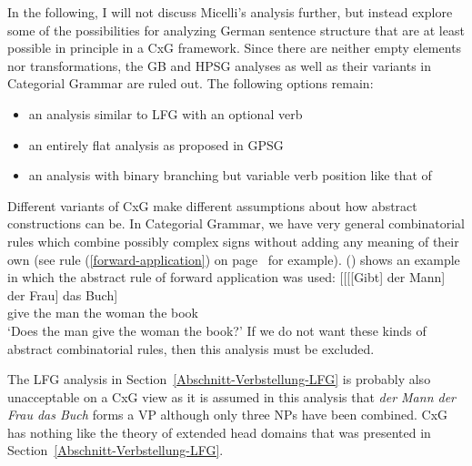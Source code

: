 In the following, I will not discuss Micelli's analysis further, but instead explore some of the possibilities for analyzing German sentence
structure that are at least possible in principle in a CxG framework. Since there are neither empty elements nor transformations, the GB and HPSG analyses
as well as their variants in Categorial Grammar are ruled out.
The following options remain:
\begin{itemize}
\item an analysis similar to LFG with an optional verb
\item  an entirely flat analysis as proposed in GPSG
\item an analysis with binary branching but variable verb position like that of \citet[]{Steedman2000a-u}
\end{itemize}
%
Different variants of CxG make different assumptions about how abstract constructions can be.
In Categorial Grammar, we have very general combinatorial rules which combine possibly complex signs without adding any meaning
of their own (see rule (\ref{forward-application}) on page~\pageref{forward-application} for
example). () shows an example in which the abstract rule of forward application was used:
\ea
\gll {}[[[[Gibt] der Mann] der Frau] das Buch]\\
	 {}\spacebr{}\spacebr{}\spacebr{}\spacebr{}give the man the woman the book\\
\glt `Does the man give the woman the book?'
\z
If we do not want these kinds of abstract combinatorial rules, then this analysis must be excluded.

The LFG analysis in Section~\ref{Abschnitt-Verbstellung-LFG} is probably also unacceptable on a CxG view as it is assumed in this analysis
that \emph{der Mann der Frau das
  Buch} forms a VP although only three NPs have been combined. CxG has nothing like the theory of extended head domains that was presented in 
  Section~\ref{Abschnitt-Verbstellung-LFG}.

